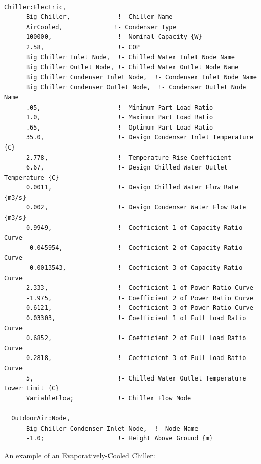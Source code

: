 \begin{lstlisting}

Chiller:Electric,
      Big Chiller,             !- Chiller Name
      AirCooled,              !- Condenser Type
      100000,                  !- Nominal Capacity {W}
      2.58,                    !- COP
      Big Chiller Inlet Node,  !- Chilled Water Inlet Node Name
      Big Chiller Outlet Node, !- Chilled Water Outlet Node Name
      Big Chiller Condenser Inlet Node,  !- Condenser Inlet Node Name
      Big Chiller Condenser Outlet Node,  !- Condenser Outlet Node Name
      .05,                     !- Minimum Part Load Ratio
      1.0,                     !- Maximum Part Load Ratio
      .65,                     !- Optimum Part Load Ratio
      35.0,                    !- Design Condenser Inlet Temperature {C}
      2.778,                   !- Temperature Rise Coefficient
      6.67,                    !- Design Chilled Water Outlet Temperature {C}
      0.0011,                  !- Design Chilled Water Flow Rate {m3/s}
      0.002,                   !- Design Condenser Water Flow Rate {m3/s}
      0.9949,                  !- Coefficient 1 of Capacity Ratio Curve
      -0.045954,               !- Coefficient 2 of Capacity Ratio Curve
      -0.0013543,              !- Coefficient 3 of Capacity Ratio Curve
      2.333,                   !- Coefficient 1 of Power Ratio Curve
      -1.975,                  !- Coefficient 2 of Power Ratio Curve
      0.6121,                  !- Coefficient 3 of Power Ratio Curve
      0.03303,                 !- Coefficient 1 of Full Load Ratio Curve
      0.6852,                  !- Coefficient 2 of Full Load Ratio Curve
      0.2818,                  !- Coefficient 3 of Full Load Ratio Curve
      5,                       !- Chilled Water Outlet Temperature Lower Limit {C}
      VariableFlow;            !- Chiller Flow Mode

  OutdoorAir:Node,
      Big Chiller Condenser Inlet Node,  !- Node Name
      -1.0;                    !- Height Above Ground {m}
\end{lstlisting}

An example of an Evaporatively-Cooled Chiller:

